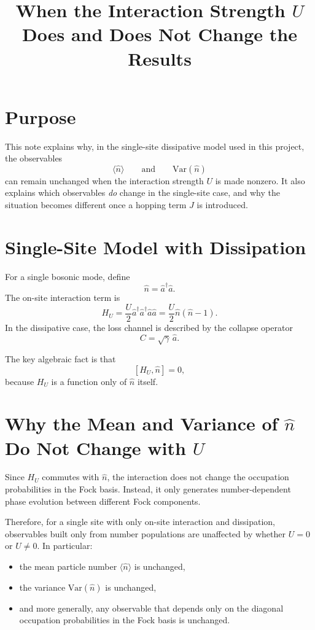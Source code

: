 \documentclass[12pt]{article}
\title{When the Interaction Strength $U$ Does and Does Not Change the Results}
\author{}
\date{}
\begin{document}
\maketitle

\section*{Purpose}
This note explains why, in the single-site dissipative model used in this project, the observables
\[
\langle \hat n \rangle
\qquad \text{and} \qquad
\mathrm{Var}(\hat n)
\]
can remain unchanged when the interaction strength $U$ is made nonzero. It also explains which observables \emph{do} change in the single-site case, and why the situation becomes different once a hopping term $J$ is introduced.

\section*{Single-Site Model with Dissipation}
For a single bosonic mode, define
\[
\hat n = \hat a^\dagger \hat a.
\]
The on-site interaction term is
\[
H_U = \frac{U}{2}\hat a^\dagger \hat a^\dagger \hat a \hat a
= \frac{U}{2}\hat n(\hat n - 1).
\]
In the dissipative case, the loss channel is described by the collapse operator
\[
C = \sqrt{\gamma}\,\hat a.
\]

The key algebraic fact is that
\[
[H_U,\hat n] = 0,
\]
because $H_U$ is a function only of $\hat n$ itself.

\section*{Why the Mean and Variance of $\hat n$ Do Not Change with $U$}
Since $H_U$ commutes with $\hat n$, the interaction does not change the occupation probabilities in the Fock basis. Instead, it only generates number-dependent phase evolution between different Fock components.

Therefore, for a single site with only on-site interaction and dissipation, observables built only from number populations are unaffected by whether $U=0$ or $U \neq 0$. In particular:
\begin{itemize}
\item the mean particle number $\langle \hat n \rangle$ is unchanged,
\item the variance $\mathrm{Var}(\hat n)$ is unchanged,
\item and more generally, any observable that depends only on the diagonal occupation probabilities in the Fock basis is unchanged.
\end{itemize}
\end{document}
